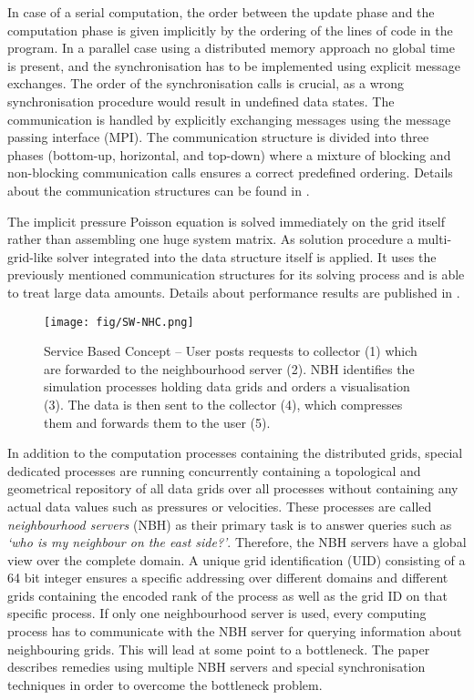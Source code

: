 \documentclass[10pt, conference]{IEEEtran}
\begin{document}
In case of a serial computation, the order between the update phase and the computation phase is given implicitly by the ordering of the lines of code in the program. In a parallel case using a
distributed memory approach no global time is present, and the synchronisation has to be implemented using explicit message exchanges. The order of the synchronisation calls is crucial, as a
wrong synchronisation procedure would result in undefined data states. The communication is handled by explicitly exchanging messages using the message passing interface (MPI). The
communication structure is divided into three phases (bottom-up, horizontal, and top-down) where a mixture of blocking and non-blocking communication calls ensures a correct predefined
ordering. Details about the communication structures can be found in \cite{Frisch2011Synasc}.

The implicit pressure Poisson equation is solved immediately on the grid itself rather than assembling one huge system matrix. As solution procedure a multi-grid-like solver integrated into the
data structure itself is applied. It uses the previously mentioned communication structures for its solving process and is able to treat large data amounts. Details about performance results are
published in \cite{Frisch2014SCPE}.


\begin{figure*}[t]
	\centering
		\texttt{[image: fig/SW-NHC.png]}
	\caption{Service Based Concept -- User posts requests to collector (1) which are forwarded to the neighbourhood server (2). NBH identifies the simulation processes holding data grids and orders a visualisation (3). The data is then sent to the collector (4), which compresses them and forwards them to the user (5).}
	\label{fig:SW-NHC}
\end{figure*}

In addition to the computation processes containing the distributed grids, special dedicated processes are running concurrently containing a topological and geometrical repository of all data
grids over all processes without containing any actual data values such as pressures or velocities. These processes are called {\em neighbourhood servers} (NBH) as their primary task is to
answer queries such as \emph{`who is my neighbour on the east side?'}. Therefore, the NBH servers have a global view over the complete domain. A unique grid identification (UID) consisting
of a 64 bit integer ensures a specific addressing over different domains and different grids containing the encoded rank of the process as well as the grid ID on that specific process. If only one
neighbourhood server is used, every computing process has to communicate with the NBH server for querying information about neighbouring grids. This will lead at some point to a bottleneck.
The paper \cite{Frisch2012ISPDC} describes remedies using multiple NBH servers and special synchronisation techniques in order to overcome the bottleneck problem.
\end{document}
